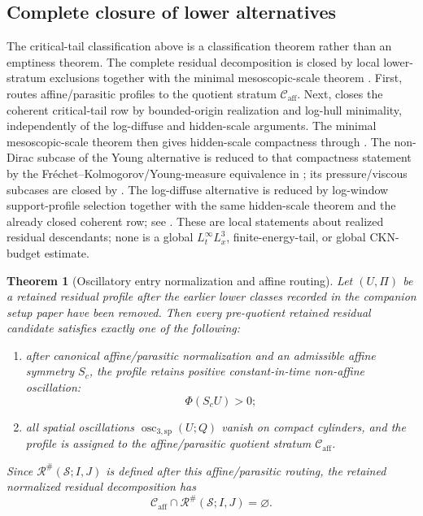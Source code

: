 \documentclass[11pt]{amsart}
\numberwithin{equation}{section}
\theoremstyle{plain}
\newtheorem{theorem}{Theorem}[section]
\theoremstyle{definition}
\theoremstyle{remark}
\newcommand{\calS}{\mathcal S}
\newcommand{\calR}{\mathcal R}
\newcommand{\Caff}{\mathcal C_{\mathrm{aff}}}
\newcommand{\MesoscopicReductionTheorem}{\Cref{thm:first-bad-mesoscopic-reduction}}
\newcommand{\oscsp}{\operatorname{osc}_{3,\mathrm{sp}}}
\begin{document}
\subsection{Complete closure of lower alternatives}
\label{sec:complete-branch-closure}

The critical-tail classification above is a classification theorem rather than
an emptiness theorem.  The complete residual decomposition is closed by
local lower-stratum exclusions together with the minimal mesoscopic-scale
theorem \MesoscopicReductionTheorem.  First,
 routes affine/parasitic profiles to
the quotient stratum \(\Caff\).  Next,
 closes the coherent critical-tail
row by bounded-origin realization and log-hull minimality, independently of the
log-diffuse and hidden-scale arguments.  The minimal mesoscopic-scale theorem
then gives hidden-scale compactness through
.  The non-Dirac subcase of
the Young alternative is reduced to that compactness statement by the
Fr\'echet--Kolmogorov/Young-measure equivalence in
; its pressure/viscous subcases are
closed by .  The log-diffuse alternative is
reduced by log-window support-profile selection together with the same
hidden-scale theorem and the already closed coherent row; see
.  These are local
statements about realized residual descendants; none is a global
\(L^\infty_tL^3_x\), finite-energy-tail, or global CKN-budget estimate.

\begin{theorem}[Oscillatory entry normalization and affine routing]
\label{thm:oscillatory-entry-normalization}
Let \((U,\Pi)\) be a retained residual profile after the earlier lower classes
recorded in the companion setup paper have been removed.  Then every
pre-quotient retained residual candidate satisfies exactly one of the following:
\begin{enumerate}[label=\textup{(\roman*)}]
   \item after canonical affine/parasitic normalization and an admissible affine
   symmetry \(S_c\), the profile retains positive constant-in-time non-affine
   oscillation:
   \[
      \Phi(S_cU)>0;
   \]
   \item all spatial oscillations \(\oscsp(U;Q)\) vanish on compact cylinders,
   and the profile is assigned to the affine/parasitic quotient stratum
   \(\Caff\).
\end{enumerate}
Since \(\calR^\#(\calS;I,J)\) is defined after this affine/parasitic routing,
the retained normalized residual decomposition has
\[
   \Caff\cap\calR^\#(\calS;I,J)=\varnothing .
\]
\end{theorem}
\end{document}
